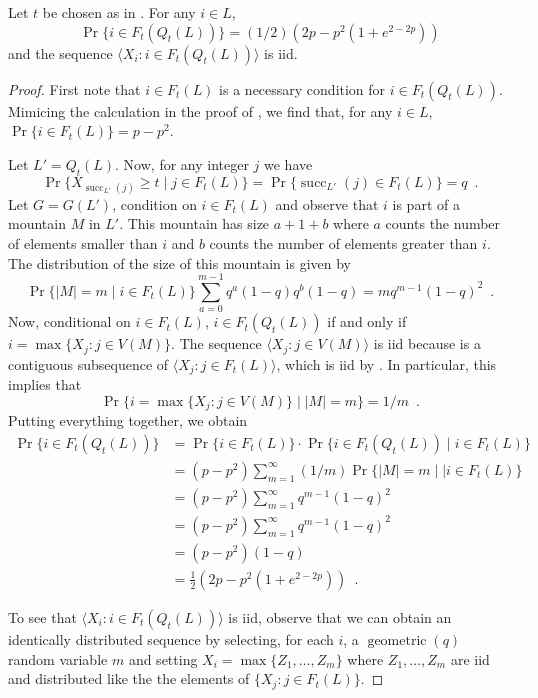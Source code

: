 \documentclass{patmorin}
\DeclareMathOperator{\cw}{succ}
\begin{document}
\begin{lem}
  Let $t$ be chosen as in . For any $i\in L$,
  \[ 
       \Pr\{i\in F_t(Q_t(L))\}= (1/2)(2p-p^{2}(1+e^{2-2p}))
  \]
  and the sequence 
  $\langle X_i:i\in F_t(Q_t(L))\rangle$ is iid.
\end{lem}

\begin{proof}
  First note that $i\in F_t(L)$ is a necessary condition for $i\in F_t(Q_t(L))$.
  Mimicing the calculation in the proof of , we
  find that, for any $i\in L$, $\Pr\{i\in F_t(L)\}=p-p^2$.

  Let $L'=Q_t(L)$.  Now, for any integer $j$ we have 
  \[
    \Pr\{X_{\cw_{L'}(j)} \ge t\mid j\in F_t(L)\} = 
    \Pr\{\cw_{L'}(j)\in F_t(L)\} = q \enspace .
  \]
  Let $G=G(L')$, condition on $i\in F_t(L)$ and observe that $i$ is part of a mountain $M$ in $L'$.  This mountain has size $a+1+b$ where $a$ counts the number of elements smaller than $i$ and $b$ counts the number of elements greater than $i$.  The distribution of the size of this mountain is given by
  \[
     \Pr\{|M|=m\mid i\in F_t(L)\}\sum_{a=0}^{m-1} q^{a}(1-q)q^b(1-q) = m q^{m-1}(1-q)^2 \enspace .
  \]
  Now, conditional on $i\in F_t(L)$, $i\in F_t(Q_t(L))$ if and only if $i=\max\{X_j: j\in V(M)\}$. The sequence $\langle X_j: j\in V(M)\rangle$ is iid because is a contiguous subsequence of $\langle X_j:j\in F_t(L)\rangle$, which is iid by .  In particular, this implies that 
  \[
    \Pr\{i=\max\{X_j: j\in V(M)\}\mid |M|=m \} = 1/m \enspace .
  \]
  Putting everything together, we obtain
  \begin{align*}
    \Pr\{i \in F_t(Q_t(L))\} 
       & = \Pr\{i\in F_t(L)\}\cdot \Pr\{i\in F_t(Q_t(L))\mid i \in F_t(L)\} \\
       & = (p-p^2)\sum_{m=1}^\infty (1/m)\Pr\{|M|=m\mid \mid i \in F_t(L)\} \\
       & = (p-p^2)\sum_{m=1}^\infty q^{m-1}(1-q)^2 \\
       & = (p-p^2)\sum_{m=1}^\infty q^{m-1}(1-q)^2 \\
       & = (p-p^2)(1-q) \\ 
       & = \frac{1}{2} \left(2p-p^{2}(1+e^{2-2p}) \right) \enspace .
  \end{align*}

  To see that $\langle X_i:i\in F_t(Q_t(L))\rangle$ is iid, observe
  that we can obtain an identically distributed sequence by selecting,
  for each $i$, a $\operatorname{geometric}(q)$ random variable $m$
  and setting $X_i=\max\{Z_1,\ldots,Z_m\}$ where $Z_1,\ldots,Z_m$ are
  iid and distributed like the the elements of $\{X_j:j\in F_t(L)\}$.
\end{proof}
\end{document}
